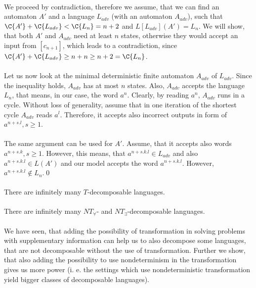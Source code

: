 \paragraph{}
We proceed by contradiction, therefore we assume, that we can find an automaton $A'$ and a language $L_{adv}$ (with an automaton $A_{adv}$), such that $\C{A'} + \C{L_{adv}} < \C{L_n} = n+2$ and $L[L_{adv}](A') = L_n$. We will show, that both $A'$ and $A_{adv}$ need at least $n$ states, otherwise they would accept an input from $[c_{n+1}]$, which leads to a contradiction, since $\C{A'} + \C{L_{adv}} \geq n+n \geq n+2 = \C{L_n}$.

\paragraph{}
Let us now look at the minimal deterministic finite  automaton $A_{adv}$ of $L_{adv}$. Since the inequality holds, $A_{adv}$ has at most $n$ states. Also, $A_{adv}$ accepts the language $L_n$, that means, in our case, the word $a^n$. Clearly, by reading $a^n$, $A_{adv}$ runs in a cycle. Without loss of generality, assume that in one iteration of the shortest cycle $A_{adv}$ reads $a^l$. Therefore, it accepts also incorrect outputs in form of $a^{n + s.l}, s \geq 1$.

\paragraph{}
The same argument can be used for $A'$. Assume, that it accepts also words $a^{n + s.k}, s \geq 1$. However, this means, that $a^{n+s.k.l} \in L_{adv}$ and also $a^{n+s.k.l} \in L(A')$ and our model accepts the word $a^{n + s.k.l}$. However, $a^{n + s.k.l} \notin L_n$.\qed

\paragraph{}
\cdosledok There are infinitely many $T$-decomposable languages.

\paragraph{}
\cdosledok There are infinitely many $NT_{\forall}$- and $NT_{\exists}$-decomposable languages.

\paragraph{}
We have seen, that adding the possibility of transformation in solving problems with supplementary information can help us to also decompose some languages, that are not decomposable without the use of transformation. Further we show, that also adding the possibility to use nondeterminism in the transformation gives us more power (i. e. the settings which use nondeterministic transformation yield bigger classes of decomposable languages).

